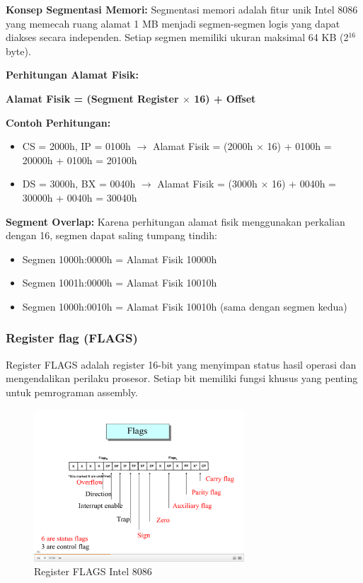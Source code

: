 \textbf{Konsep Segmentasi Memori:}
Segmentasi memori adalah fitur unik Intel 8086 yang memecah ruang alamat 1 MB menjadi segmen-segmen logis yang dapat diakses secara independen. Setiap segmen memiliki ukuran maksimal 64 KB (2$^{16}$ byte).

\textbf{Perhitungan Alamat Fisik:}
\begin{center}
\textbf{Alamat Fisik = (Segment Register $\times$ 16) + Offset}
\end{center}

\textbf{Contoh Perhitungan:}
\begin{itemize}
    \item CS = 2000h, IP = 0100h $\rightarrow$ Alamat Fisik = (2000h $\times$ 16) + 0100h = 20000h + 0100h = 20100h
    \item DS = 3000h, BX = 0040h $\rightarrow$ Alamat Fisik = (3000h $\times$ 16) + 0040h = 30000h + 0040h = 30040h
\end{itemize}

\textbf{Segment Overlap:}
Karena perhitungan alamat fisik menggunakan perkalian dengan 16, segmen dapat saling tumpang tindih:
\begin{itemize}
    \item Segmen 1000h:0000h = Alamat Fisik 10000h
    \item Segmen 1001h:0000h = Alamat Fisik 10010h
    \item Segmen 1000h:0010h = Alamat Fisik 10010h (sama dengan segmen kedua)
\end{itemize}

\subsubsection{Register flag (FLAGS)}
Register FLAGS adalah register 16-bit yang menyimpan status hasil operasi dan mengendalikan perilaku prosesor. Setiap bit memiliki fungsi khusus yang penting untuk pemrograman assembly.

\begin{figure}[h]
\centering
\includegraphics[width=0.7\textwidth]{8086_flags_register.png}
\caption{Register FLAGS Intel 8086}
\label{fig:8086-flags-register}
\end{figure}

